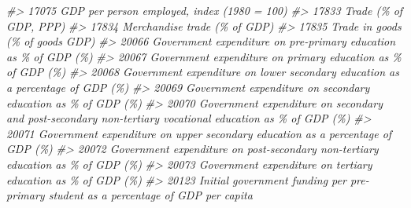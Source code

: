 \documentclass[
]{bxjsbook}
\newenvironment{Shaded}{\begin{snugshade}}{\end{snugshade}}
\newcommand{\CommentTok}[1]{\textcolor[rgb]{0.56,0.35,0.01}{\textit{#1}}}
\theoremstyle{definition}
\theoremstyle{definition}
\theoremstyle{definition}
\theoremstyle{definition}
\theoremstyle{remark}
\begin{document}
\begin{Shaded}
\begin{Highlighting}[]
\CommentTok{\#\textgreater{} 17075                                                                                                                               GDP per person employed, index (1980 = 100)}
\CommentTok{\#\textgreater{} 17833                                                                                                                                                     Trade (\% of GDP, PPP)}
\CommentTok{\#\textgreater{} 17834                                                                                                                                              Merchandise trade (\% of GDP)}
\CommentTok{\#\textgreater{} 17835                                                                                                                                           Trade in goods (\% of goods GDP)}
\CommentTok{\#\textgreater{} 20066                                                                                                           Government expenditure on pre{-}primary education as \% of GDP (\%)}
\CommentTok{\#\textgreater{} 20067                                                                                                               Government expenditure on primary education as \% of GDP (\%)}
\CommentTok{\#\textgreater{} 20068                                                                                            Government expenditure on lower secondary education as a percentage of GDP (\%)}
\CommentTok{\#\textgreater{} 20069                                                                                                             Government expenditure on secondary education as \% of GDP (\%)}
\CommentTok{\#\textgreater{} 20070                                                                  Government expenditure on secondary and post{-}secondary non{-}tertiary vocational education as \% of GDP (\%)}
\CommentTok{\#\textgreater{} 20071                                                                                            Government expenditure on upper secondary education as a percentage of GDP (\%)}
\CommentTok{\#\textgreater{} 20072                                                                                           Government expenditure on post{-}secondary non{-}tertiary education as \% of GDP (\%)}
\CommentTok{\#\textgreater{} 20073                                                                                                              Government expenditure on tertiary education as \% of GDP (\%)}
\CommentTok{\#\textgreater{} 20123                                                                                      Initial government funding per pre{-}primary student as a percentage of GDP per capita}

\end{Highlighting}
\end{Shaded}
\end{document}
